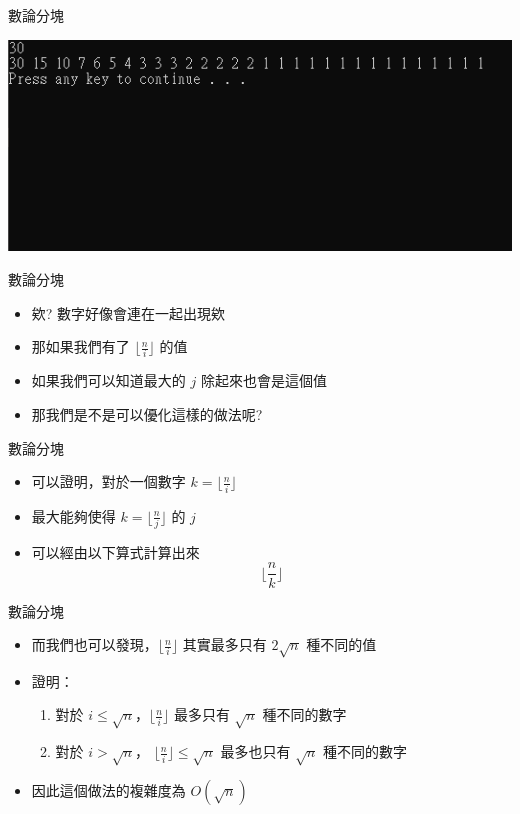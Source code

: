 \documentclass[aspectratio=169]{beamer}
\begin{document}
    \begin{frame}[fragile]{數論分塊}
        \begin{center}
            \includegraphics[scale=0.7]{images/number_theory_block.png}
        \end{center}
    \end{frame}
    
    \begin{frame}[fragile]{數論分塊}
        \begin{itemize}
            \item 欸? 數字好像會連在一起出現欸
            \item 那如果我們有了 $\lfloor \frac{n}{i} \rfloor$ 的值
            \item 如果我們可以知道最大的 $j$ 除起來也會是這個值
            \item 那我們是不是可以優化這樣的做法呢?
        \end{itemize}
    \end{frame}
    
    \begin{frame}[fragile]{數論分塊}
        \begin{itemize}
            \item 可以證明，對於一個數字 $k = \lfloor \frac{n}{i} \rfloor$
            \item 最大能夠使得 $k = \lfloor \frac{n}{j} \rfloor$ 的 $j$
            \item 可以經由以下算式計算出來
            $$\Big \lfloor \frac{n}{k} \Big \rfloor$$
        \end{itemize}
    \end{frame}
    
    \begin{frame}[fragile]{數論分塊}
        \begin{itemize}
            \item 而我們也可以發現，$\lfloor \frac{n}{i} \rfloor$ 其實最多只有 $2 \sqrt{n}$ 種不同的值
            \item 證明：
            \begin{enumerate}
                \item 對於 $i \le \sqrt{n}$，$\lfloor \frac{n}{i} \rfloor$ 最多只有 $\sqrt{n}$ 種不同的數字
                \item 對於 $i > \sqrt{n}$， $\lfloor \frac{n}{i} \rfloor \le \sqrt{n}$ 最多也只有 $\sqrt{n}$ 種不同的數字
            \end{enumerate}
            \item 因此這個做法的複雜度為 $O(\sqrt{n})$
        \end{itemize}
    \end{frame}
    
\end{document}
